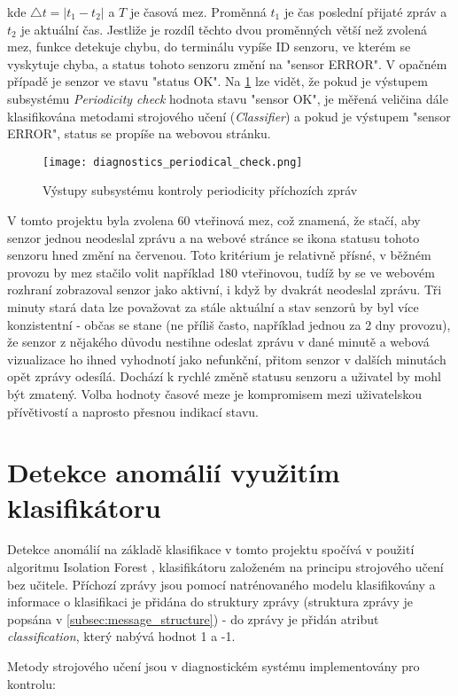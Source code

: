 kde \( \triangle t = |t_1 - t_2| \) a $T$ je časová mez. Proměnná $t_1$ je čas poslední přijaté zpráv a $t_2$ je aktuální čas. Jestliže je rozdíl těchto dvou proměnných větší než zvolená mez, funkce detekuje chybu, do terminálu vypíše ID senzoru, ve kterém se vyskytuje chyba, a status tohoto senzoru změní na "sensor ERROR". V opačném případě je senzor ve stavu "status OK". Na \cref{fig:diagnostics_periodical_check} lze vidět, že pokud je výstupem subsystému \textit{Periodicity check} hodnota stavu "sensor OK", je měřená veličina dále klasifikována metodami strojového učení (\textit{Classifier}) a pokud je výstupem "sensor ERROR", status se propíše na webovou stránku.

\begin{figure}[H]
  \centering
  \texttt{[image: diagnostics\_periodical\_check.png]}
  \caption{Výstupy subsystému kontroly periodicity příchozích zpráv}
  \label{fig:diagnostics_periodical_check}
\end{figure} 

V tomto projektu byla zvolena 60 vteřinová mez, což znamená, že stačí, aby senzor jednou neodeslal zprávu a na webové stránce se ikona statusu tohoto senzoru hned změní na červenou. Toto kritérium je relativně přísné, v běžném provozu by mez stačilo volit například 180 vteřinovou, tudíž by se ve webovém rozhraní zobrazoval senzor jako aktivní, i když by dvakrát neodeslal zprávu. Tři minuty stará data lze považovat za stále aktuální a stav senzorů by byl více konzistentní - občas se stane (ne příliš často, například jednou za 2 dny provozu), že senzor z nějakého důvodu nestihne odeslat zprávu v dané minutě a webová vizualizace ho ihned vyhodnotí jako nefunkční, přitom senzor v dalších minutách opět zprávy odesílá. Dochází k rychlé změně statusu senzoru a uživatel by mohl být zmatený. Volba hodnoty časové meze je kompromisem mezi uživatelskou přívětivostí a naprosto přesnou indikací stavu. 

\section{Detekce anomálií využitím klasifikátoru} \label{sec:classifier}
Detekce anomálií na základě klasifikace v tomto projektu spočívá v použití algoritmu Isolation Forest \cite{scikit-learn}, klasifikátoru založeném na principu strojového učení bez učitele. Příchozí zprávy jsou pomocí natrénovaného modelu klasifikovány a informace o klasifikaci je přidána do struktury zprávy (struktura zprávy je popsána v \cref{subsec:message_structure}) - do zprávy je přidán atribut \textit{classification}, který nabývá hodnot 1 a -1. \par
Metody strojového učení jsou v diagnostickém systému implementovány pro kontrolu:

